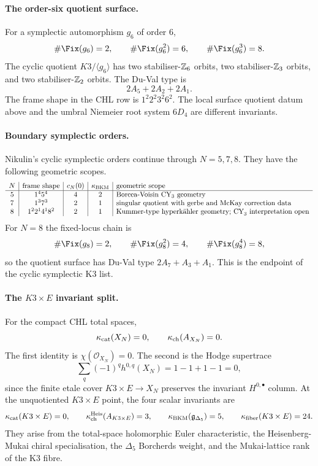 \paragraph{The order-six quotient surface.}
For a symplectic automorphism $g_6$ of order $6$,
\[
\#\Fix(g_6)=2,\qquad \#\Fix(g_6^2)=6,\qquad \#\Fix(g_6^3)=8.
\]
The cyclic quotient $K3/\langle g_6\rangle$ has two stabiliser-$\mathbb{Z}_6$
orbits, two stabiliser-$\mathbb{Z}_3$ orbits, and two stabiliser-$\mathbb{Z}_2$
orbits. The Du-Val type is
\[
2A_5+2A_2+2A_1.
\]
The frame shape in the CHL row is $1^2 2^2 3^2 6^2$. The local
surface quotient datum above and the umbral Niemeier root system
$6D_4$ are different invariants.

\paragraph{Boundary symplectic orders.}
Nikulin's cyclic symplectic orders continue through $N=5,7,8$. They
have the following geometric scopes.
\[
\begin{array}{c|c|c|c|l}
N & \text{frame shape} & c_N(0) & \kappa_{\mathrm{BKM}} & \text{geometric scope}\\
\hline
5 & 1^4 5^4 & 4 & 2 &
  \text{Borcea-Voisin CY}_3\text{ geometry}\\
7 & 1^3 7^3 & 2 & 1 &
  \text{singular quotient with gerbe and McKay correction data}\\
8 & 1^2 2^1 4^1 8^2 & 2 & 1 &
  \text{Kummer-type hyperk\"ahler geometry; CY}_3\text{ interpretation open}
\end{array}
\]
For $N=8$ the fixed-locus chain is
\[
\#\Fix(g_8)=2,\qquad
\#\Fix(g_8^2)=4,\qquad
\#\Fix(g_8^4)=8,
\]
so the quotient surface has Du-Val type $2A_7+A_3+A_1$. This is the
endpoint of the cyclic symplectic K3 list.

\paragraph{The $K3\times E$ invariant split.}
For the compact CHL total spaces,
\[
\kappa_{\mathrm{cat}}(X_N)=0,\qquad \kappa_{\mathrm{ch}}(A_{X_N})=0.
\]
The first identity is $\chi(\mathcal O_{X_N})=0$. The second is the
Hodge supertrace
\[
\sum_q(-1)^q h^{0,q}(X_N)=1-1+1-1=0,
\]
since the finite etale cover $K3\times E\to X_N$ preserves the
invariant $H^{0,\bullet}$ column. At the unquotiented
$K3\times E$ point, the four scalar invariants are
\[
\kappa_{\mathrm{cat}}(K3\times E)=0,\qquad
\kappa_{\mathrm{ch}}^{\mathrm{Heis}}(A_{K3\times E})=3,\qquad
\kappa_{\mathrm{BKM}}(\mathfrak g_{\Delta_5})=5,\qquad
\kappa_{\mathrm{fiber}}(K3\times E)=24.
\]
They arise from the total-space holomorphic Euler characteristic, the
Heisenberg-Mukai chiral specialisation, the $\Delta_5$ Borcherds
weight, and the Mukai-lattice rank of the K3 fibre.
